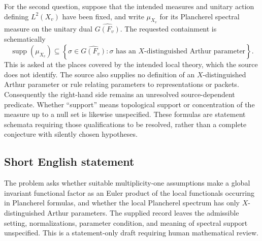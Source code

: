 \documentclass[11pt]{article}
\begin{document}
For the second question, suppose that the intended measures and unitary action defining \(L^2(X_v)\) have been fixed, and write \(\mu_{X_v}\) for its Plancherel spectral measure on the unitary dual \(\widehat{G(F_v)}\). The requested containment is schematically
\[
\operatorname{supp}(\mu_{X_v})
\subseteq
\left\{\sigma\in\widehat{G(F_v)}:
\sigma\text{ has an }X\text{-distinguished Arthur parameter}\right\}.
\]
This is asked at the places covered by the intended local theory, which the source does not identify. The source also supplies no definition of an \(X\)-distinguished Arthur parameter or rule relating parameters to representations or packets. Consequently the right-hand side remains an unresolved source-dependent predicate. Whether ``support'' means topological support or concentration of the measure up to a null set is likewise unspecified. These formulas are statement schemata requiring those qualifications to be resolved, rather than a complete conjecture with silently chosen hypotheses.
\subsection{Short English statement}
The problem asks whether suitable multiplicity-one assumptions make a global invariant functional factor as an Euler product of the local functionals occurring in Plancherel formulas, and whether the local Plancherel spectrum has only \(X\)-distinguished Arthur parameters. The supplied record leaves the admissible setting, normalizations, parameter condition, and meaning of spectral support unspecified. This is a statement-only draft requiring human mathematical review.
\end{document}

